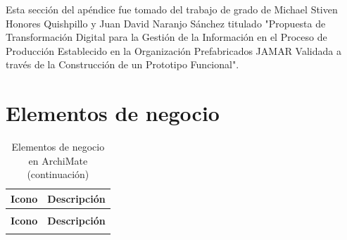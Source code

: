 Esta sección del apéndice fue tomado del trabajo de grado de Michael Stiven Honores Quishpillo y Juan David Naranjo Sánchez titulado "Propuesta de Transformación Digital para la Gestión de la Información en el Proceso de Producción Establecido en la Organización Prefabricados JAMAR Validada a través de la Construcción de un Prototipo Funcional". 

\section{Elementos de negocio}

\begin{longtable}{|c|p{8cm}|}
\caption{Elementos de negocio en ArchiMate} \label{tab:elementos-negocio-archimate} \\
\hline
\textbf{Icono} & \textbf{Descripción} \\
\hline
\endfirsthead

\caption[]{Elementos de negocio en ArchiMate (continuación)} \\
\hline
\textbf{Icono} & \textbf{Descripción} \\
\hline
\endhead

\hline
\endfoot


\end{longtable}
